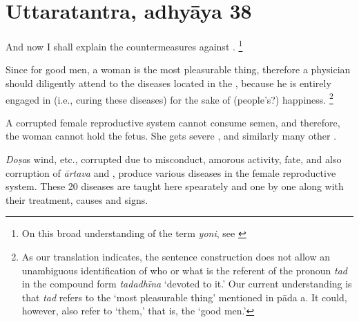 
\section{Uttaratantra, adhyāya 38}

\begin{translation}

\item [1] And now I shall explain the countermeasures against .%
	\footnote{%
	On this broad understanding of the term \emph{yoni}, see \cite[pp.\ 
	572--5]{das-orig}}

\item [2] Since for good men, a woman is the most pleasurable thing, therefore a physician should diligently attend to the diseases located in the , because he is entirely engaged in (i.e., curing these diseases) for the sake of (people's?) happiness.%
	\footnote{%
	As our translation indicates, the sentence construction does not allow an 
	unambiguous identification of who or what is the referent of the pronoun 
	\textit{tad} in the compound form \emph{tadadhīna} ‘devoted to it.’ Our 
	current understanding is that \emph{tad} refers to the ‘most pleasurable thing’ 
	mentioned in pāda a. It could, however, also refer to ‘them,’ that is, the ‘good 
	men.’%
	}

\item [3] A corrupted female reproductive system cannot consume semen, and therefore, the woman cannot hold the fetus. She gets severe ,  and similarly many other .

\item [4] \emph{Doṣa}s wind, etc., corrupted due to misconduct, amorous activity, fate, and also corruption of \emph{ārtava} and , produce various diseases in the female reproductive system. These 20 diseases are taught here spearately and one by one along with their treatment, causes and signs.


\end{translation}
